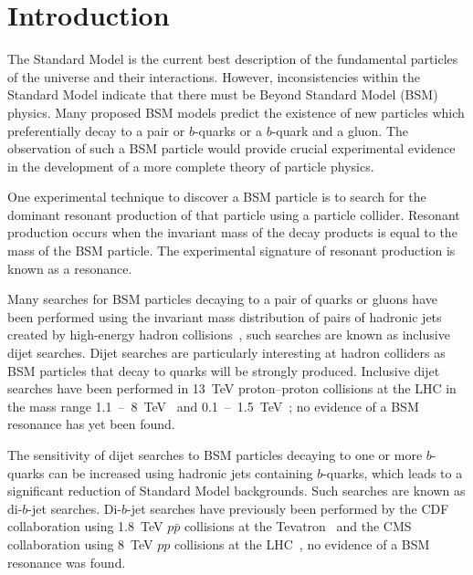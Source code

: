 \chapter{Introduction}
\label{sec:int}
The Standard Model is the current best description of the fundamental particles of the universe and their interactions.
However, inconsistencies within the Standard Model indicate that
there must be Beyond Standard Model (BSM) physics.
Many proposed BSM models predict the existence of new particles
which preferentially decay to a pair or $b$-quarks or a $b$-quark and a gluon.
The observation of such a BSM particle would provide crucial experimental
evidence in the development of a more complete theory of particle physics.


One experimental technique to discover a BSM particle is to search for
the dominant resonant production of that particle using a particle collider.
Resonant production occurs when the invariant mass of the decay products is equal to the mass of the BSM particle.
The experimental signature of resonant production is known as a resonance.

Many searches for BSM particles decaying to a pair of quarks or gluons
have been performed using the invariant mass distribution of pairs of hadronic jets created
by high-energy hadron collisions~\cite{theo-dijet_harris}, such searches are known as inclusive dijet searches.
Dijet searches are particularly interesting at hadron colliders as BSM particles
that decay to quarks will be strongly produced.
Inclusive dijet searches have been performed in 13~TeV proton--proton collisions at the LHC
in the mass range 1.1~--~8~TeV~\cite{dijet-mori16_paper,dijet-mori17_paper,dijet-cms}
and 0.1~--~1.5~TeV~\cite{dijet-isr,dijet-TLA,dijet-isr_cms};
no evidence of a BSM resonance has yet been found.

The sensitivity of dijet searches to BSM particles decaying to one or more $b$-quarks can be increased
using hadronic jets containing $b$-quarks,
which leads to a significant reduction of Standard Model backgrounds.
Such searches are known as di-$b$-jet searches.
Di-$b$-jet searches have previously been performed by
the CDF collaboration using 1.8~TeV $p\bar{p}$ collisions at the Tevatron~\cite{dibjet-cdf}
and the CMS collaboration using 8~TeV $pp$ collisions at the LHC~\cite{dibjet-cms},
no evidence of a BSM resonance was found.

